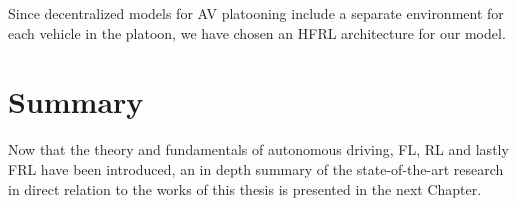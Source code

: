Since decentralized models for AV platooning include a separate environment for each
vehicle in the platoon, we have chosen an HFRL architecture for our model.

\section{Summary}
Now that the theory and fundamentals of autonomous driving, FL, RL and lastly FRL 
have been introduced, an in depth summary of the state-of-the-art research in 
direct relation to the works of this thesis is presented in the next Chapter.